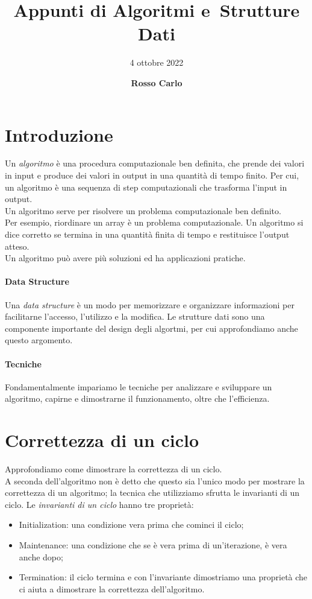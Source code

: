 \documentclass{article}
\title{\vspace{2cm}\textbf{Appunti di Algoritmi e\ Strutture Dati}}
\author{\vspace{3mm}4 ottobre 2022}
\date{\vspace{3mm} \textbf{Rosso Carlo}}
\begin{document}
\begin{titlepage}
	\maketitle
	\thispagestyle{empty}
\end{titlepage}
\tableofcontents
\newpage

\section{Introduzione}
Un \textit{algoritmo} è una procedura computazionale ben definita, che prende dei valori
in input e produce dei valori in output in una quantità di tempo finito. Per cui,
un algoritmo è una sequenza di step computazionali che trasforma l'input in
output.\\
Un algoritmo serve per risolvere un problema computazionale ben definito.\\
Per esempio, riordinare un array è un problema computazionale.
Un algoritmo si dice corretto se termina in una quantità finita di tempo e
restituisce l'output atteso.\\
Un algoritmo può avere più soluzioni ed ha applicazioni pratiche.

\paragraph{Data Structure} Una \textit{data structure} è un modo per memorizzare e
organizzare informazioni per facilitarne l'accesso, l'utilizzo e la modifica.
Le strutture dati sono una componente importante del design degli algortmi, per
cui approfondiamo anche questo argomento.

\paragraph{Tecniche} Fondamentalmente impariamo le tecniche per analizzare e
sviluppare un algoritmo, capirne e dimostrarne il funzionamento, oltre che
l'efficienza.

\section{Correttezza di un ciclo}
Approfondiamo come dimostrare la correttezza di un ciclo.\\
A seconda dell'algoritmo non è detto che questo sia l'unico modo per mostrare la
correttezza di un algoritmo; la tecnica che utilizziamo sfrutta le invarianti di
un ciclo. Le \textit{invarianti di un ciclo} hanno tre proprietà:
\begin{itemize}
    \item Initialization: una condizione vera prima che cominci il ciclo;
    \item Maintenance: una condizione che se è vera prima di un'iterazione, è
        vera anche dopo;
    \item Termination: il ciclo termina e con l'invariante dimostriamo una
        proprietà che ci aiuta a dimostrare la correttezza dell'algoritmo.
\end{itemize}
\end{document}
